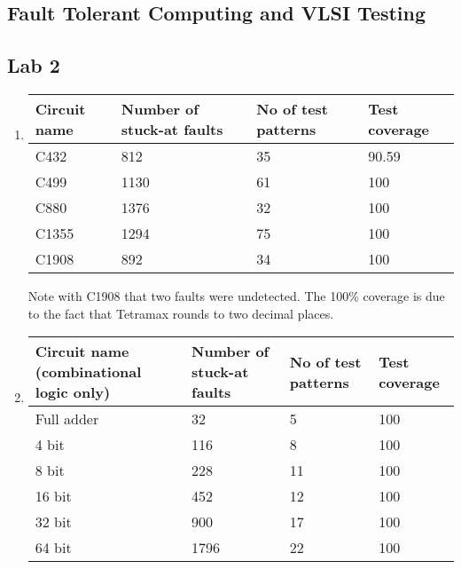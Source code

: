 \documentclass[a4paper,12pt]{article}
\begin{document}
    \begin{center}
        \section*{Fault Tolerant Computing and VLSI Testing}
        \subsection*{Lab 2}
    \end{center}

    \begin{enumerate}

        \item \begin{tabularx}{\textwidth}{|X|X|X|X|}
                \hline
                Circuit name & Number of stuck-at faults & No of test patterns & Test coverage \\ \hline
                C432 & 812 & 35 & 90.59 \\ \hline
                C499 & 1130 & 61 & 100 \\ \hline
                C880 & 1376 & 32 & 100 \\ \hline
                C1355 & 1294 & 75 & 100 \\ \hline
                C1908 & 892 & 34 & 100 \\ \hline
            \end{tabularx}

            Note with C1908 that two faults were undetected. The 100\% coverage is due to the fact that Tetramax rounds to two decimal places.

        \item \begin{tabularx}{\textwidth}{|X|X|X|X|}
                \hline
                Circuit name (combinational logic only) & Number of stuck-at faults & No of test patterns & Test coverage \\ \hline
                Full adder & 32 & 5 & 100 \\ \hline
                4 bit & 116 & 8 & 100 \\ \hline
                8 bit & 228 & 11 & 100 \\ \hline
                16 bit & 452 & 12 & 100 \\ \hline
                32 bit & 900 & 17 & 100 \\ \hline
                64 bit & 1796 & 22 & 100 \\ \hline
            \end{tabularx}


\end{enumerate}
\end{document}
